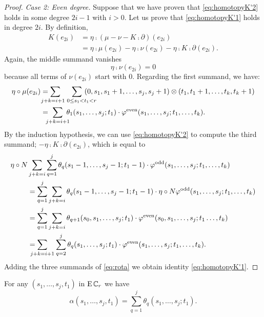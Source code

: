 \begin{proof}
	\medskip\noindent\emph{Case 2: Even degree.}
	Suppose that we have proven that \eqref{eq:homotopyK'2} holds in some degree $2i-1$ with $i>0$. Let us prove that \eqref{eq:homotopyK'1} holds in degree $2i$. By definition,
	\begin{equation}\label{eq:rota}
		\begin{split}
			K(e_{2i}) &= \eta \comp (\mu-\nu-K \comp \partial)(e_{2i})\\
			&= \eta \comp\mu(e_{2i})- \eta\comp\nu(e_{2i})- \eta\comp K \comp \partial(e_{2i}).
		\end{split}
	\end{equation}
	Again, the middle summand vanishes
	\[\eta \comp \nu(e_{2i}) = 0
	\]
	because all terms of $\nu(e_{2i})$ start with $0$.
	Regarding the first summand, we have:
	\[
	\begin{split}
		\eta\comp \mu(e_{2i}) &= \sum_{\mathclap{j+k=i+1}\ \ } \hspace*{14pt} \sum_{\ \quad \mathclap{0 \leq s_1<t_1<r}} \ (0,s_1,s_1+1,\ldots,s_j,s_j+1)\otimes (t_1,t_1+1,\ldots,t_k,t_k+1)
		\\
		&= \ \sum_{\mathclap{j+k=i+1}} \ \theta_1(s_1,\dots,s_j;t_1) \cdot \varphi^{\mathrm{even}}(s_1,\dots,s_j;t_1,\dots,t_k).
	\end{split}
	\]
	By the induction hypothesis, we can use \eqref{eq:homotopyK'2} to compute the third summand; $-\eta \comp K \comp \partial(e_{2i})$, which is equal to
	\[
	\begin{split}
		\eta\circ N&\sum_{j+k=i}\sum_{q=1}^{j}\theta_q(s_1-1,\dots,s_j-1;t_1-1)\cdot \varphi^{\mathrm{odd}}(s_1,\dots,s_j;t_1,\dots,t_k) \\ &=
		\sum_{q=1}^{j}\sum_{j+k=i}\theta_q(s_1-1,\dots,s_j-1;t_1-1)\cdot \eta\circ N\varphi^{\mathrm{odd}}(s_1,\dots,s_j;t_1,\dots,t_k) \\ &= \sum_{q=1}^{j}\sum_{j+k=i}\theta_{q+1}(s_0,s_1,\dots,s_{j};t_1)\cdot \varphi^{\mathrm{even}}(s_0,s_1,\dots,s_{j};t_1\dots,t_k) \\ &=
		\sum_{\mathclap{j+k = i+1}} \quad \sum_{q=2}^{j} \theta_q(s_1,\dots,s_{j};t_1)\cdot \varphi^{\mathrm{even}}(s_1,\dots,s_{j};t_1,\dots,t_k).
	\end{split}
	\]
	Adding the three summands of \eqref{eq:rota} we obtain identity \eqref{eq:homotopyK'1}.
\end{proof}

\begin{lemma}
	For any $(s_1,\ldots,s_j,t_1)$ in $\operatorname{E}\mathbb{C}_r$ we have
	\[
	\alpha(s_1,\ldots,s_j,t_1) = \sum_{q=1}^j\theta_q(s_1,\ldots,s_j;t_1).
	\]
\end{lemma}

